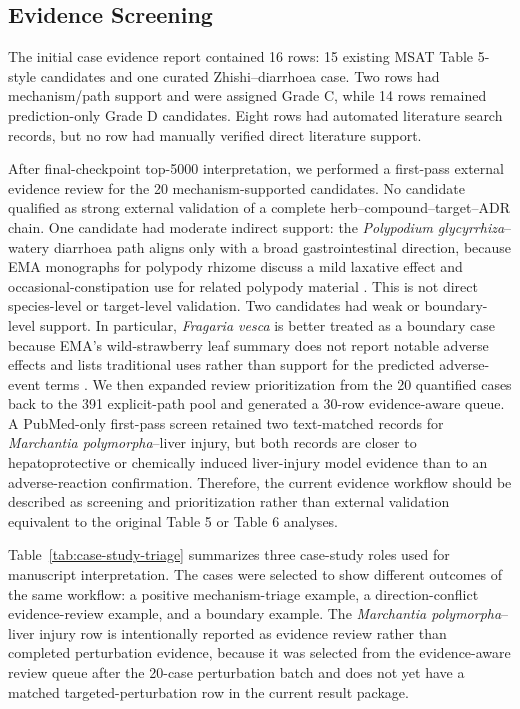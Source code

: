 \documentclass[manuscript,screen,review]{acmart}
\newcommand{\msat}{MSAT}
\begin{document}
\subsection{Evidence Screening}

The initial case evidence report contained 16 rows: 15 existing \msat{} Table 5-style candidates and one curated Zhishi--diarrhoea case. Two rows had mechanism/path support and were assigned Grade C, while 14 rows remained prediction-only Grade D candidates. Eight rows had automated literature search records, but no row had manually verified direct literature support.

After final-checkpoint top-5000 interpretation, we performed a first-pass external evidence review for the 20 mechanism-supported candidates. No candidate qualified as strong external validation of a complete herb--compound--target--ADR chain. One candidate had moderate indirect support: the \textit{Polypodium glycyrrhiza}--watery diarrhoea path aligns only with a broad gastrointestinal direction, because EMA monographs for polypody rhizome discuss a mild laxative effect and occasional-constipation use for related polypody material \cite{ema_polypodii,ema_polypodii_assessment}. This is not direct species-level or target-level validation. Two candidates had weak or boundary-level support. In particular, \textit{Fragaria vesca} is better treated as a boundary case because EMA's wild-strawberry leaf summary does not report notable adverse effects and lists traditional uses rather than support for the predicted adverse-event terms \cite{ema_fragariae}. We then expanded review prioritization from the 20 quantified cases back to the 391 explicit-path pool and generated a 30-row evidence-aware queue. A PubMed-only first-pass screen retained two text-matched records for \textit{Marchantia polymorpha}--liver injury, but both records are closer to hepatoprotective or chemically induced liver-injury model evidence than to an adverse-reaction confirmation. Therefore, the current evidence workflow should be described as screening and prioritization rather than external validation equivalent to the original Table 5 or Table 6 analyses.

Table~\ref{tab:case-study-triage} summarizes three case-study roles used for manuscript interpretation. The cases were selected to show different outcomes of the same workflow: a positive mechanism-triage example, a direction-conflict evidence-review example, and a boundary example. The \textit{Marchantia polymorpha}--liver injury row is intentionally reported as evidence review rather than completed perturbation evidence, because it was selected from the evidence-aware review queue after the 20-case perturbation batch and does not yet have a matched targeted-perturbation row in the current result package.
\end{document}
